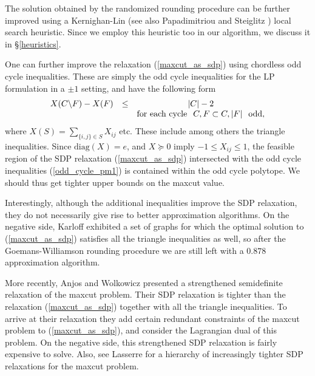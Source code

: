 \documentclass[12pt]{article}
\begin{document}
The solution obtained by the randomized rounding procedure can be
further improved using a Kernighan-Lin \cite{Kernighan1} (see also
Papadimitriou and Steiglitz \cite{papadimitriou_steiglitz}) local
search heuristic. Since we employ this heuristic too in our
algorithm, we discuss it in \S\ref{heuristics}.

One can further improve the relaxation (\ref{maxcut_as_sdp}) using
chordless odd cycle inequalities. These are simply the odd cycle
inequalities for the LP formulation in a $\pm 1$ setting, and have
the following form
\begin{eqnarray}
\label{odd_cycle_pm1}
\begin{array}{ccc}
X(C \backslash F) - X(F) & \le & |C|-2 \\
& & \mbox{for each cycle} \hspace*{0.25cm} C, F \subset C, |F|
\hspace*{0.25cm} \mbox{odd},
\end{array}
\end{eqnarray}
where $X(S) = \displaystyle \sum_{\{i,j\} \in S} X_{ij}$ etc.
These include among others the triangle inequalities. Since $
\mbox{diag}(X) = e$, and $X \succeq 0$ imply $-1 \le X_{ij} \le
1$, the feasible region of the SDP relaxation
(\ref{maxcut_as_sdp}) intersected with the odd cycle inequalities
(\ref{odd_cycle_pm1}) is contained within the odd cycle polytope.
We should thus get tighter upper bounds on the maxcut value.

Interestingly, although the additional inequalities improve the
SDP relaxation, they do not necessarily give rise to better
approximation algorithms. On the negative side, Karloff
\cite{karloff1} exhibited a set of graphs for which the optimal
solution to (\ref{maxcut_as_sdp}) satisfies all the triangle
inequalities as well, so after the Goemans-Williamson rounding
procedure we are still left with a $0.878$ approximation
algorithm.

More recently, Anjos and Wolkowicz \cite{anjos1} presented a
strengthened semidefinite relaxation of the maxcut problem. Their
SDP relaxation is tighter than the relaxation
(\ref{maxcut_as_sdp}) together with all the triangle inequalities.
To arrive at their relaxation they add certain redundant
constraints of the maxcut problem to (\ref{maxcut_as_sdp}), and
consider the Lagrangian dual of this problem. On the negative
side, this strengthened SDP relaxation is fairly expensive to
solve. Also, see Lasserre \cite{lasserre1,lasserre2} for a
hierarchy of increasingly tighter SDP relaxations for the maxcut
problem.
\end{document}
